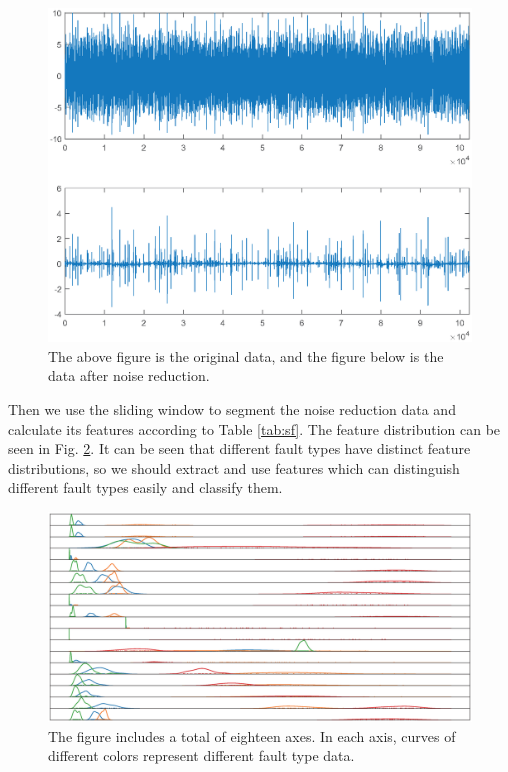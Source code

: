 \documentclass{modified}
\begin{document}
\begin{figure}[htbp]
	\centering
	\includegraphics[width=\columnwidth]{pre.eps}
	\caption{The above figure is the original data, and the figure below is the data after noise reduction.}
	\label{fig:pre}
\end{figure}

Then we use the sliding window to segment the noise reduction data and calculate its features according to Table \ref{tab:sf}. The feature distribution can be seen in Fig. \ref{fig:feature}. It can be seen that different fault types have distinct feature distributions, so we should extract and use features which can distinguish different fault types easily and classify them.

\begin{figure}[htbp]
	\centering
	\includegraphics[width=\columnwidth]{feature.eps}
	\caption{The figure includes a total of eighteen axes. In each axis, curves of different colors represent different fault type data.}
	\label{fig:feature}
\end{figure}
\end{document}
